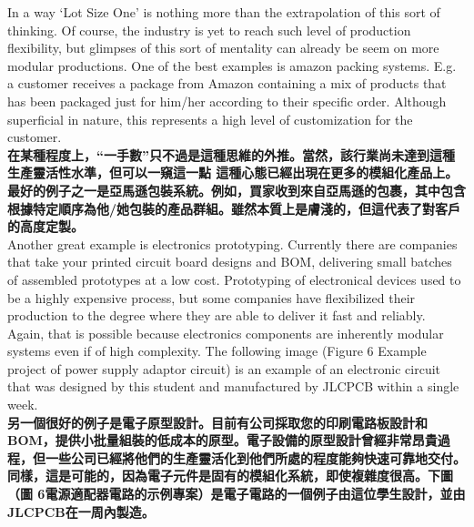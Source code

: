 \documentclass[24pt]{article} %
\begin{document}
In a way ‘Lot Size One’ is nothing more than the extrapolation of this sort of thinking. Of course, the industry is yet to reach such level of production flexibility, but glimpses of this sort of mentality can already be seem on more modular productions. One of the best examples is amazon packing systems. E.g. a customer receives a package from Amazon containing a mix of products that has been packaged just for him/her according to their specific order. Although superficial in nature, this represents a high level of customization for the customer.\\

\textbf{在某種程度上，“一手數”只不過是這種思維的外推。當然，該行業尚未達到這種生產靈活性水準，但可以一窺這一點 這種心態已經出現在更多的模組化產品上。最好的例子之一是亞馬遜包裝系統。例如，買家收到來自亞馬遜的包裹，其中包含根據特定順序為他/她包裝的產品群組。雖然本質上是膚淺的，但這代表了對客戶的高度定製。}\\

Another great example is electronics prototyping. Currently there are companies that take your printed circuit board designs and BOM, delivering small batches of assembled prototypes at a low cost. Prototyping of electronical devices used to be a highly expensive process, but some companies have flexibilized their production to the degree where they are able to deliver it fast and reliably. Again, that is possible because electronics components are inherently modular systems even if of high complexity. The following image (Figure 6 Example project of power supply adaptor circuit) is an example of an electronic circuit that was designed by this student and manufactured by JLCPCB within a single week.\\

\textbf{另一個很好的例子是電子原型設計。目前有公司採取您的印刷電路板設計和 BOM，提供小批量組裝的低成本的原型。電子設備的原型設計曾經非常昂貴過程，但一些公司已經將他們的生產靈活化到他們所處的程度能夠快速可靠地交付。同樣，這是可能的，因為電子元件是固有的模組化系統，即使複雜度很高。下圖（圖 6電源適配器電路的示例專案）是電子電路的一個例子由這位學生設計，並由JLCPCB在一周內製造。}\\
\end{document}
